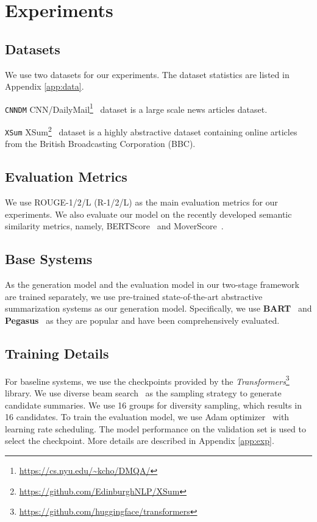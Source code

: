 \documentclass[11pt,a4paper]{article}
\begin{document}
\section{Experiments}

\subsection{Datasets}
We use two datasets for our experiments. 
The dataset statistics are listed in Appendix \ref{app:data}.

\noindent\texttt{CNNDM} CNN/DailyMail\footnote{\url{https://cs.nyu.edu/~kcho/DMQA/}}~\citep{10.5555/2969239.2969428,nallapati-etal-2016-abstractive} dataset is a large scale news articles dataset.

\noindent\texttt{XSum}
XSum\footnote{\url{https://github.com/EdinburghNLP/XSum}}~\citep{narayan-etal-2018-dont} dataset is a highly abstractive dataset containing online articles from the British Broadcasting Corporation (BBC).


\subsection{Evaluation Metrics}

We use ROUGE-1/2/L (R-1/2/L) as the main evaluation metrics for our experiments. 
We also evaluate our model on the recently developed semantic similarity metrics, namely, BERTScore~\citep{DBLP:conf/iclr/ZhangKWWA20} and MoverScore~\citep{zhao-etal-2019-moverscore}.

\subsection{Base Systems}

As the generation model and the evaluation model in our two-stage framework are trained separately, we use pre-trained state-of-the-art abstractive summarization systems as our generation model. 
Specifically, we use \textbf{BART}~\citep{lewis-etal-2020-bart} and \textbf{Pegasus}~\citep{zhang2020pegasus} as they are popular and have been comprehensively evaluated.

\subsection{Training Details}
For baseline systems, we use the checkpoints provided by the \textit{Transformers}\footnote{\url{https://github.com/huggingface/transformers}}~\citep{wolf-etal-2020-transformers} library. 
We use diverse beam search~\citep{DBLP:journals/corr/VijayakumarCSSL16} as the sampling strategy to generate candidate summaries.
We use 16 groups for diversity sampling, which results in 16 candidates.
To train the evaluation model, we use Adam optimizer~\citep{DBLP:journals/corr/KingmaB14} with learning rate scheduling.
The model performance on the validation set is used to select the checkpoint.
More details are described in Appendix \ref{app:exp}. 
\end{document}
